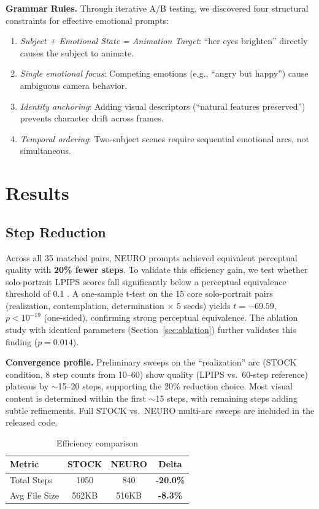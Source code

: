 \documentclass[10pt,twocolumn,letterpaper]{article}
\begin{document}
\textbf{Grammar Rules.} Through iterative A/B testing, we discovered four structural constraints for effective emotional prompts:
\begin{enumerate}
    \item \textit{Subject + Emotional State = Animation Target}: ``her eyes brighten'' directly causes the subject to animate.
    \item \textit{Single emotional focus}: Competing emotions (e.g., ``angry but happy'') cause ambiguous camera behavior.
    \item \textit{Identity anchoring}: Adding visual descriptors (``natural features preserved'') prevents character drift across frames.
    \item \textit{Temporal ordering}: Two-subject scenes require sequential emotional arcs, not simultaneous.
\end{enumerate}

\section{Results}

\subsection{Step Reduction}

Across all 35 matched pairs, NEURO prompts achieved equivalent perceptual quality with \textbf{20\% fewer steps}. To validate this efficiency gain, we test whether solo-portrait LPIPS scores fall significantly below a perceptual equivalence threshold of 0.1 \cite{zhang2018,lakens2017equivalence}. A one-sample t-test on the 15 core solo-portrait pairs (realization, contemplation, determination $\times$ 5 seeds) yields $t = -69.59$, $p < 10^{-19}$ (one-sided), confirming strong perceptual equivalence. The ablation study with identical parameters (Section~\ref{sec:ablation}) further validates this finding ($p = 0.014$).

\textbf{Convergence profile.} Preliminary sweeps on the ``realization'' arc (STOCK condition, 8 step counts from 10--60) show quality (LPIPS vs.\ 60-step reference) plateaus by $\sim$15--20 steps, supporting the 20\% reduction choice. Most visual content is determined within the first $\sim$15 steps, with remaining steps adding subtle refinements. Full STOCK vs.\ NEURO multi-arc sweeps are included in the released code.

\begin{table}[t]
\centering
\begin{tabular}{lccc}
\toprule
\textbf{Metric} & \textbf{STOCK} & \textbf{NEURO} & \textbf{Delta} \\
\midrule
Total Steps & 1050 & 840 & \textbf{-20.0\%} \\
Avg File Size & 562KB & 516KB & \textbf{-8.3\%} \\
\bottomrule
\end{tabular}
\caption{Efficiency comparison}
\end{table}
\end{document}
